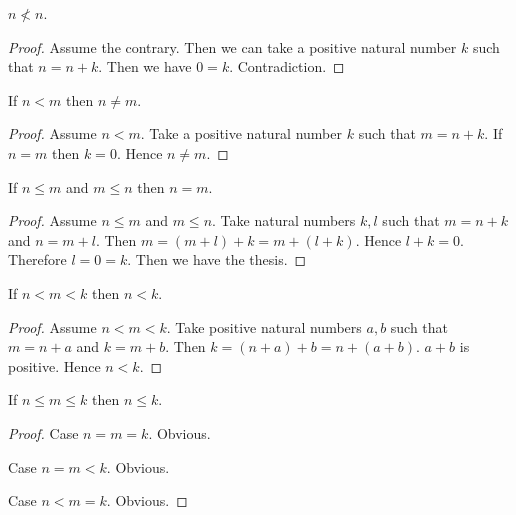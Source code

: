 \documentclass[../../arithmetic.ftl.tex]{subfiles}
\begin{document}
  \begin{forthel}
    \begin{proposition}\label{Arithmetic_02_01_659871}
      $n \nless n$.
    \end{proposition}
    \begin{proof}
      Assume the contrary.
      Then we can take a positive natural number $k$ such that $n = n + k$.
      Then we have $0 = k$.
      Contradiction.
    \end{proof}


    \begin{proposition}\label{Arithmetic_02_01_679789}
      If $n < m$ then $n \neq m$.
    \end{proposition}
    \begin{proof}
      Assume $n < m$.
      Take a positive natural number $k$ such that $m = n + k$.
      If $n = m$ then $k = 0$.
      Hence $n \neq m$.
    \end{proof}


    \begin{proposition}\label{Arithmetic_02_01_710123}
      If $n \leq m$ and $m \leq n$ then $n = m$.
    \end{proposition}
    \begin{proof}
      Assume $n \leq m$ and $m \leq n$.
      Take natural numbers $k,l$ such that $m = n + k$ and $n = m + l$.
      Then $m = (m + l) + k = m + (l + k)$.
      Hence $l + k = 0$.
      Therefore $l = 0 = k$.
      Then we have the thesis.
    \end{proof}


    \begin{proposition}\label{Arithmetic_02_01_662806}
      If $n < m < k$ then $n < k$.
    \end{proposition}
    \begin{proof}
      Assume $n < m < k$.
      Take positive natural numbers $a,b$ such that $m = n + a$ and $k = m + b$.
      Then $k = (n + a) + b = n + (a + b)$.
      $a + b$ is positive.
      Hence $n < k$.
    \end{proof}


    \begin{proposition}\label{Arithmetic_02_01_394529}
      If $n \leq m \leq k$ then $n \leq k$.
    \end{proposition}
    \begin{proof}
      Case $n = m = k$. Obvious.

      Case $n = m < k$. Obvious.

      Case $n < m = k$. Obvious.


\end{proof}
\end{forthel}
\end{document}
